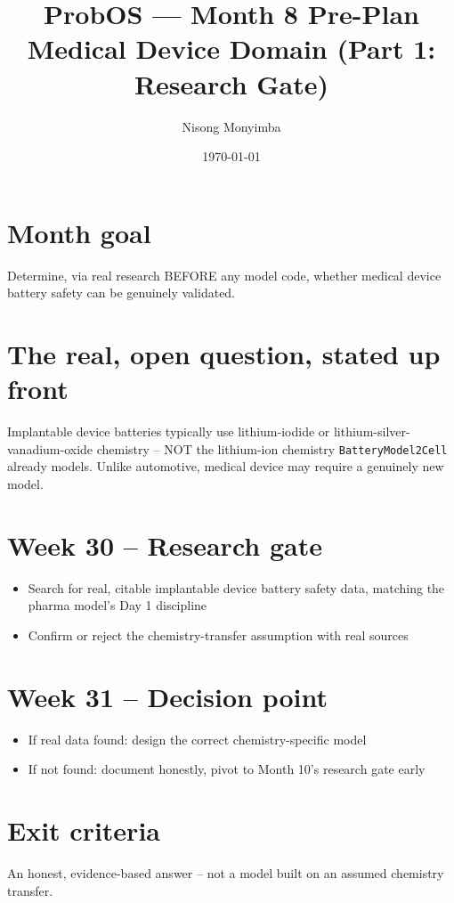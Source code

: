 \documentclass[11pt]{article}
\title{ProbOS --- Month 8 Pre-Plan\\Medical Device Domain (Part 1: Research Gate)}
\author{Nisong Monyimba}
\date{\today}
\begin{document}
\maketitle

\section*{Month goal}
Determine, via real research BEFORE any model code, whether medical
device battery safety can be genuinely validated.

\section*{The real, open question, stated up front}
Implantable device batteries typically use lithium-iodide or
lithium-silver-vanadium-oxide chemistry -- NOT the lithium-ion
chemistry \texttt{BatteryModel2Cell} already models. Unlike
automotive, medical device may require a genuinely new model.

\section*{Week 30 -- Research gate}
\begin{itemize}[leftmargin=*]
  \item Search for real, citable implantable device battery safety
    data, matching the pharma model's Day 1 discipline
  \item Confirm or reject the chemistry-transfer assumption with real
    sources
\end{itemize}

\section*{Week 31 -- Decision point}
\begin{itemize}[leftmargin=*]
  \item If real data found: design the correct chemistry-specific
    model
  \item If not found: document honestly, pivot to Month 10's research
    gate early
\end{itemize}

\section*{Exit criteria}
An honest, evidence-based answer -- not a model built on an assumed
chemistry transfer.
\end{document}
